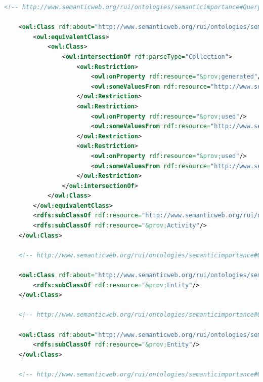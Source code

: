 \begin{lstlisting}[language=XML,caption={Semantic Importance Ontology File (update this file)}]
    <!-- http://www.semanticweb.org/rui/ontologies/semanticimportance#QueryParticipation -->

    <owl:Class rdf:about="http://www.semanticweb.org/rui/ontologies/semanticimportance#QueryParticipation">
        <owl:equivalentClass>
            <owl:Class>
                <owl:intersectionOf rdf:parseType="Collection">
                    <owl:Restriction>
                        <owl:onProperty rdf:resource="&prov;generated"/>
                        <owl:someValuesFrom rdf:resource="http://www.semanticweb.org/rui/ontologies/semanticimportance#QueryResult"/>
                    </owl:Restriction>
                    <owl:Restriction>
                        <owl:onProperty rdf:resource="&prov;used"/>
                        <owl:someValuesFrom rdf:resource="http://www.semanticweb.org/rui/ontologies/semanticimportance#DataGraph"/>
                    </owl:Restriction>
                    <owl:Restriction>
                        <owl:onProperty rdf:resource="&prov;used"/>
                        <owl:someValuesFrom rdf:resource="http://www.semanticweb.org/rui/ontologies/semanticimportance#QueryEngine"/>
                    </owl:Restriction>
                </owl:intersectionOf>
            </owl:Class>
        </owl:equivalentClass>
        <rdfs:subClassOf rdf:resource="http://www.semanticweb.org/rui/ontologies/semanticimportance#SemanticImportance"/>
        <rdfs:subClassOf rdf:resource="&prov;Activity"/>
    </owl:Class>
  
    <!-- http://www.semanticweb.org/rui/ontologies/semanticimportance#QueryParticipationFrequency -->

    <owl:Class rdf:about="http://www.semanticweb.org/rui/ontologies/semanticimportance#QueryParticipationFrequency">
        <rdfs:subClassOf rdf:resource="&prov;Entity"/>
    </owl:Class>

    <!-- http://www.semanticweb.org/rui/ontologies/semanticimportance#QueryParticipationRecency -->

    <owl:Class rdf:about="http://www.semanticweb.org/rui/ontologies/semanticimportance#QueryParticipationRecency">
        <rdfs:subClassOf rdf:resource="&prov;Entity"/>
    </owl:Class>

    <!-- http://www.semanticweb.org/rui/ontologies/semanticimportance#QueryRelevance -->


\end{lstlisting}
